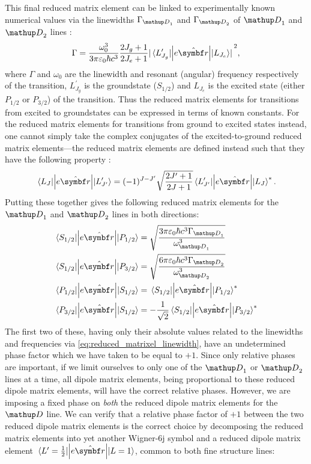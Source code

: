 This final reduced matrix element can be linked to experimentally known numerical values via the linewidths $\Gamma_{\up{D}_1}$ and $\Gamma_{\up{D}_2}$ of $\up{D}_1$ and $\up{D}_2$ lines \cite[eq.~7.3.7.4]{steck_quantum_2017}:
\begin{align}\label{eq:reduced_matrixel_linewidth}
\Gamma = \frac{\omega_0^3}{3\pi\varepsilon_0\hbar c^3}\frac{2J_g + 1}{2J_e + 1}\abs{\matrixel{L^\prime_{J_g}}{\left|e\hat{\vec r}\right|}{L_{J_e}}}^2,
\end{align}
where $\Gamma$ and $\omega_0$ are the linewidth and resonant (angular) frequency respectively of the transition, $L^\prime_{J_g}$ is the groundstate ($S_{1/2}$) and $L_{J_e}$ is the excited state (either $P_{1/2}$ or ${P_{3/2}}$) of the transition. Thus the reduced matrix elements for transitions from excited to groundstates can be expressed in terms of known constants. For the reduced matrix elements for transitions from ground to excited states instead, one cannot simply take the complex conjugates of the excited-to-ground reduced matrix elements---the reduced matrix elements are defined instead such that they have the following property \cite[eq.~7.3.5.1]{steck_quantum_2017}:
\begin{align}
\matrixel{L_J}{\left|e\hat{\vec r}\right|}{L^\prime_{J^\prime}}
= (-1)^{J - J^\prime}\sqrt{\frac{2J^\prime+1}{2J+1}}
\matrixel{L^\prime_{J^\prime}}{\left|e\hat{\vec r}\right|}{L_J}^*.
\end{align}
Putting these together gives the following reduced matrix elements for the $\up{D}_1$ and $\up{D}_2$ lines in both directions:
\begin{align}
\matrixel{S_{1/2}}{\left|e\hat{\vec r}\right|}{P_{1/2}}
&= \sqrt{\frac{3\pi\varepsilon_0\hbar c^3 \Gamma_{\up{D}_1}}{\omega_{\up{D}_1}^3}}\\
\matrixel{S_{1/2}}{\left|e\hat{\vec r}\right|}{P_{3/2}}
&= \sqrt{\frac{6\pi\varepsilon_0\hbar c^3 \Gamma_{\up{D}_2}}{\omega_{\up{D}_2}^3}}\\
\matrixel{P_{1/2}}{\left|e\hat{\vec r}\right|}{S_{1/2}}
&= \matrixel{S_{1/2}}{\left|e\hat{\vec r}\right|}{P_{1/2}}^*\\
\matrixel{P_{3/2}}{\left|e\hat{\vec r}\right|}{S_{1/2}}
&= -\frac1{\sqrt2}\matrixel{S_{1/2}}{\left|e\hat{\vec r}\right|}{P_{3/2}}^*
\end{align}
The first two of these, having only their absolute values related to the linewidths and frequencies via \eqref{eq:reduced_matrixel_linewidth}, have an undetermined phase factor which we have taken to be equal to $+1$. Since only relative phases are important, if we limit ourselves to only one of the $\up{D}_1$ or $\up{D}_2$ lines at a time, all dipole matrix elements, being proportional to these reduced dipole matrix elements, will have the correct relative phases. However, we are imposing a fixed phase on \emph{both} the reduced dipole matrix elements for the $\up{D}$ line. We can verify that a relative phase factor of $+1$ between the two reduced dipole matrix elements is the correct choice by decomposing \cite{steck_rubidium_2015} the reduced matrix elements into yet another Wigner-6j symbol and a reduced dipole matrix element $\matrixel{L^\prime=\frac12}{\left|e\hat{\vec r}\right|}{L=1}$, common to both fine structure lines:
